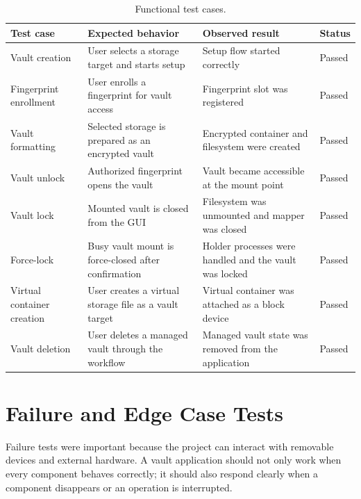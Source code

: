 \begin{table}[!htbp]
\centering
\caption{\label{tab:functional-tests}Functional test cases.}
\small
\begin{tabularx}{\textwidth}{lXXX}
\toprule
Test case & Expected behavior & Observed result & Status\\
\midrule
Vault creation & User selects a storage target and starts setup & Setup flow started correctly & Passed\\
Fingerprint enrollment & User enrolls a fingerprint for vault access & Fingerprint slot was registered & Passed\\
Vault formatting & Selected storage is prepared as an encrypted vault & Encrypted container and filesystem were created & Passed\\
Vault unlock & Authorized fingerprint opens the vault & Vault became accessible at the mount point & Passed\\
Vault lock & Mounted vault is closed from the GUI & Filesystem was unmounted and mapper was closed & Passed\\
Force-lock & Busy vault mount is force-closed after confirmation & Holder processes were handled and the vault was locked & Passed\\
Virtual container creation & User creates a virtual storage file as a vault target & Virtual container was attached as a block device & Passed\\
Vault deletion & User deletes a managed vault through the workflow & Managed vault state was removed from the application & Passed\\
\bottomrule
\end{tabularx}
\end{table}

\section{Failure and Edge Case Tests}

Failure tests were important because the project can interact with removable devices and external hardware. A vault application should not only work when every component behaves correctly; it should also respond clearly when a component disappears or an operation is interrupted.

